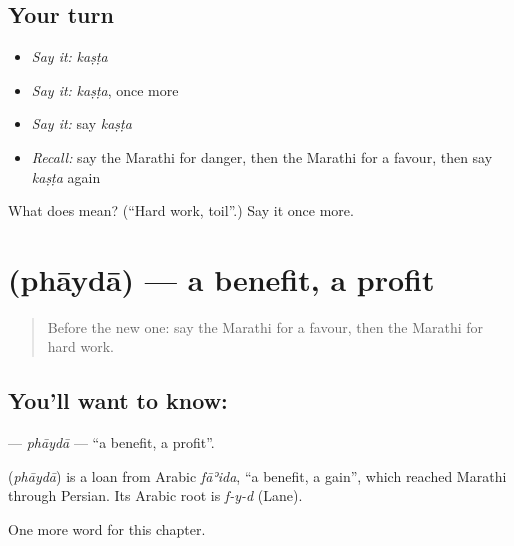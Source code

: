 \subsection*{Your turn}
\begin{itemize}
\raggedright
  \item \emph{Say it:} \emph{kaṣṭa}
  \item \emph{Say it:} \emph{kaṣṭa}, once more
  \item \emph{Say it:} say \emph{kaṣṭa}
  \item \emph{Recall:} say the Marathi for danger, then the Marathi for a favour, then say \emph{kaṣṭa} again
\end{itemize}

\begin{tcolorbox}[breakable,colback=teal!4,colframe=teal!35!black,title={Before you move on}]
What does  mean? (\textquotedblleft{}Hard work, toil\textquotedblright{}.) Say it once more.
\end{tcolorbox}
\section[\texorpdfstring{\mr{फायदा} (phāydā)}{फायदा (phāydā)}]{ (phāydā) — a benefit, a profit}

\label{lesson:MR-C189-phayda}



\begin{quote}
Before the new one: say the Marathi for a favour, then the Marathi for hard work.
\end{quote}

\subsection*{You'll want to know: }
\textbf{} — \emph{phāydā} — \textquotedblleft{}a benefit, a profit\textquotedblright{}.

\begin{cousinweb}
\textbf{} (\emph{phāydā}) is a loan from Arabic \emph{fāʾida}, \textquotedblleft{}a benefit, a gain\textquotedblright{}, which reached Marathi through Persian. Its Arabic root is \emph{f-y-d} (Lane).
\end{cousinweb}

\begin{grammarlens}[title={What you've built}]
One more word for this chapter.
\end{grammarlens}

